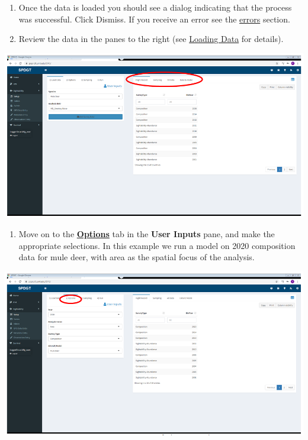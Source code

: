 \documentclass[
]{book}
\providecommand{\tightlist}{%
  \setlength{\itemsep}{0pt}\setlength{\parskip}{0pt}}
\begin{document}
\begin{enumerate}
\def\labelenumi{\arabic{enumi}.}
\setcounter{enumi}{3}
\item
  Once the data is loaded you should see a dialog indicating that the process was successful. Click Dismiss. If you receive an error see the \protect\hyperlink{sight-errors}{errors} section.
\item
  Review the data in the panes to the right (see \protect\hyperlink{sight-load}{Loading Data} for details).
\end{enumerate}

\includegraphics{./www/sight_03.PNG}

\begin{enumerate}
\def\labelenumi{\arabic{enumi}.}
\setcounter{enumi}{5}
\tightlist
\item
  Move on to the \protect\hyperlink{sight-options}{\textbf{Options}} tab in the \textbf{User Inputs} pane, and make the appropriate selections. In this example we run a model on 2020 composition data for mule deer, with area as the spatial focus of the analysis.
\end{enumerate}

\includegraphics{./www/sight_04.PNG}
\end{document}
